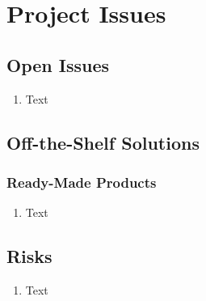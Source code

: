 \documentclass [11pt]{article}
\begin{document}

\section {Project Issues} 

\subsection{Open Issues}
	\begin{enumerate}[label=\textbf{(\roman*)}]
		\item Text
	\end{enumerate}

\subsection{Off-the-Shelf Solutions}

\subsubsection{Ready-Made Products}
	\begin{enumerate}[label=\textbf{(\roman*)}]
		\item Text
	\end{enumerate}

\subsection{Risks}
	\begin{enumerate}[label=\textbf{(\roman*)}]
		\item Text
	\end{enumerate}

\end{document}
